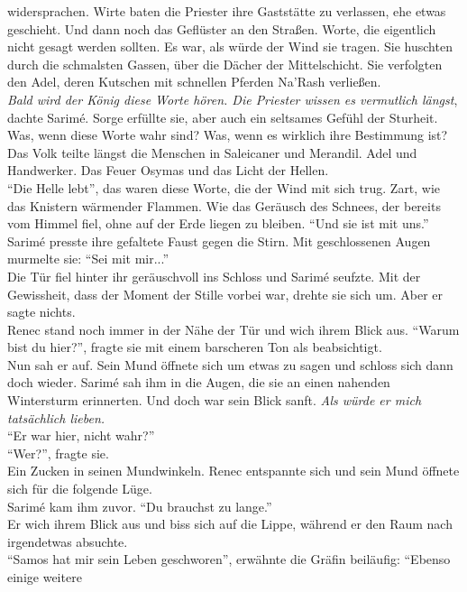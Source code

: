 widersprachen. Wirte baten die Priester ihre Gaststätte zu verlassen, ehe etwas geschieht. Und dann 
noch das Geflüster an den Straßen. Worte, die eigentlich nicht gesagt werden sollten. Es war, als 
würde der Wind sie tragen. Sie huschten durch die schmalsten Gassen, über die Dächer der 
Mittelschicht. Sie verfolgten den Adel, deren Kutschen mit schnellen Pferden Na'Rash verließen.\\
\textit{Bald wird der König diese Worte hören. Die Priester wissen es vermutlich längst}, dachte 
Sarimé. Sorge erfüllte sie, aber auch ein seltsames Gefühl der Sturheit. Was, wenn diese Worte wahr 
sind? Was, wenn es wirklich ihre Bestimmung ist?\\
Das Volk teilte längst die Menschen in Saleicaner und Merandil. Adel und Handwerker. Das Feuer 
Osymas und das Licht der Hellen.\\
``Die Helle lebt'', das waren diese Worte, die der Wind mit sich trug. Zart, wie das Knistern 
wärmender Flammen. Wie das Geräusch des Schnees, der bereits vom Himmel fiel, ohne auf der 
Erde liegen zu bleiben. ``Und sie ist mit uns.''\\
Sarimé presste ihre gefaltete Faust gegen die Stirn. Mit geschlossenen Augen murmelte sie: ``Sei 
mit mir...''\\
Die Tür fiel hinter ihr geräuschvoll ins Schloss und Sarimé seufzte. Mit der Gewissheit, dass der 
Moment der Stille vorbei war, drehte sie sich um. Aber er sagte nichts.\\
Renec stand noch immer in der Nähe der Tür und wich ihrem Blick aus. ``Warum bist du hier?'', 
fragte sie mit einem barscheren Ton als beabsichtigt.\\
Nun sah er auf. Sein Mund öffnete sich um etwas zu sagen und schloss sich dann doch wieder. 
Sarimé sah ihm in die Augen, die sie an einen nahenden Wintersturm erinnerten. Und doch war 
sein Blick sanft. \textit{Als würde er mich tatsächlich lieben.}\\
``Er war hier, nicht wahr?''\\
``Wer?'', fragte sie.\\
Ein Zucken in seinen Mundwinkeln. Renec entspannte sich und sein Mund öffnete sich für die folgende 
Lüge.\\
Sarimé kam ihm zuvor. ``Du brauchst zu lange.''\\
Er wich ihrem Blick aus und biss sich auf die Lippe, während er den Raum nach irgendetwas 
absuchte.\\
``Samos hat mir sein Leben geschworen'', erwähnte die Gräfin beiläufig: ``Ebenso einige weitere 
